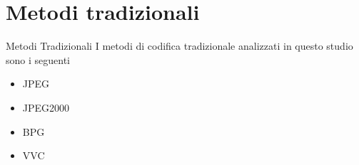 \section{Metodi tradizionali}

    \begin{frame}{Metodi Tradizionali}
        I metodi di codifica tradizionale analizzati in questo studio sono i seguenti
        \begin{itemize}
            \item JPEG \cite{125072}
            \item JPEG2000 \cite{952804}
            \item BPG \cite{BPGImageformat}
            \item VVC \cite{9503377}
        \end{itemize}
    \end{frame}
    